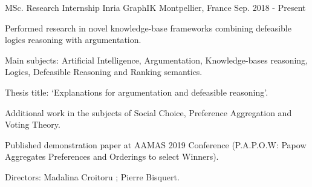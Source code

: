 

\begin{cventries}

  \cventry
    {MSc. Research Internship}
    {Inria GraphIK}
    {Montpellier, France}
    {Sep. 2018 - Present}
    {
      \begin{cvitems}
        \item Performed research in novel knowledge-base frameworks combining defeasible logics reasoning with argumentation.
        \item Main subjects: Artificial Intelligence, Argumentation, Knowledge-bases reasoning, Logics, Defeasible Reasoning and Ranking semantics. 
        \item Thesis title: `Explanations for argumentation and defeasible reasoning'.
        \item Additional work in the subjects of Social Choice, Preference Aggregation and Voting Theory. 
        \item Published demonstration paper at AAMAS 2019 Conference (P.A.P.O.W: Papow Aggregates Preferences and Orderings to select Winners).
        \item Directors: Madalina Croitoru ; Pierre Bisquert.
      \end{cvitems}
    }  

\end{cventries}
